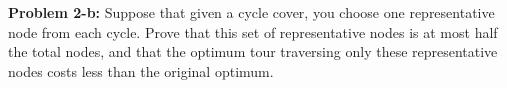\documentclass[psamsfonts]{amsart}
\newenvironment{sol}{\vspace{0.25cm}{\large \bfseries Solution:}}{\qedsymbol}
\newenvironment{prob}[1]{\begin{framed}{\large \bfseries Problem #1:}}{\end{framed}}
\begin{document}
\begin{prob}{2-b}
Suppose that given a cycle cover, you choose one representative node from each cycle. Prove that this set of representative nodes is at most half the total nodes, and that the optimum tour traversing only these representative nodes costs less than the original optimum.
\end{prob}
\begin{sol}

\end{sol}
\end{document}
